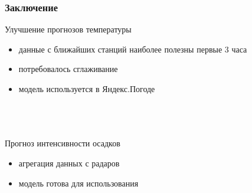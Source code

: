 \documentclass{beamer}
\begin{document}



\begin{frame}\frametitle{\large Заключение}

Улучшение прогнозов температуры
\begin{itemize}
    \item данные с ближайших станций наиболее полезны первые 3 часа
    \item потребовалось сглаживание
    \item модель используется в Яндекс.Погоде
\end{itemize}

\\\vspace\\\hspace\\

Прогноз интенсивности осадков
\begin{itemize}
    \item агрегация данных с радаров
    \item модель готова для использования
\end{itemize}


\end{frame}
\end{document}
